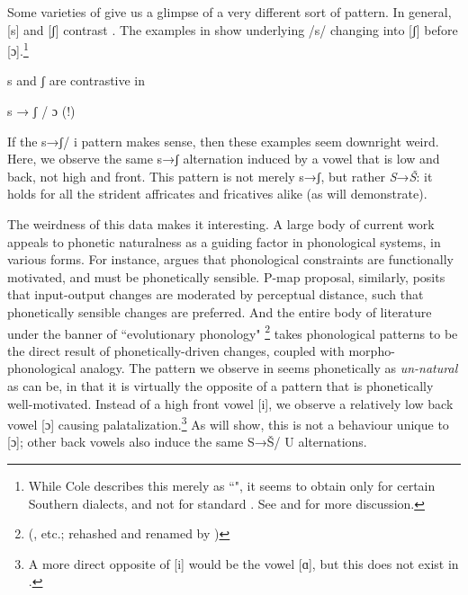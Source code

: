 \documentclass[output=paper,newtxmath,modfonts,nonflat]{langsci/langscibook}
\begin{document}
Some varieties of  give us a glimpse of a very different sort of pattern. In general, [s] and [ʃ] contrast . The examples in  \citep[from][]{Cole1955} show underlying /s/ changing into [ʃ] before [ɔ].\footnote{While Cole describes this merely as ``", it seems to obtain only for certain Southern dialects, and not for standard . See  and  for more discussion.}

\ea\label{ex:bennett:1}
s and ʃ are contrastive in  \citep[25]{Cole1955}\\
\z

\ea\label{ex:bennett:2}
s → ʃ / {\longrule} ɔ (!)
\ea\label{ex:bennett:2a}
\ex\label{ex:bennett:2b} 
\ex\label{ex:bennett:2c} 
\z
\z

If the s→ʃ/ {\longrule} i pattern makes sense, then these examples seem downright weird. Here, we observe the same s→ʃ alternation induced by a vowel that is low and back, not high and front. This pattern is not merely s→ʃ, but rather \textit{S}→\textit{Š}: it holds for all the strident affricates and fricatives alike (as  will demonstrate).

The weirdness of this data makes it interesting. A large body of current work appeals to phonetic naturalness as a guiding factor in phonological systems, in various forms. For instance, \citet{Hayes1999} argues that phonological constraints are functionally motivated, and must be phonetically sensible.  P-map proposal, similarly, posits that input-output changes are moderated by perceptual distance, such that phonetically sensible changes are preferred. And the entire body of literature under the banner of ``evolutionary phonology"
\footnote{(\citealt{Ohala1981,Ohala1990,Ohala:2004aa}, etc.; rehashed and renamed by \citealt{Blevins2004})} takes phonological patterns to be the direct result of phonetically-driven changes, coupled with morpho-phonological analogy. The pattern we observe in  seems phonetically as \textit{un-natural} as can be, in that it is virtually the opposite of a pattern that is phonetically well-motivated. Instead of a high front vowel [i], we observe a relatively low back vowel [ɔ] causing palatalization.\footnote{A more direct opposite of [i] would be the vowel [ɑ], but this does not exist in .} As  will show, this is not a behaviour unique to [ɔ]; other back vowels also induce the same S→Š/ {\longrule} U alternations.
\end{document}
